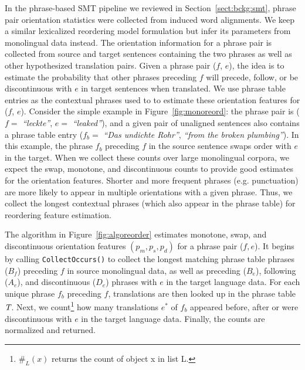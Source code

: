 \documentclass[11pt]{article}
\newcommand{\mnote}[1]{\marginpar{%
  \vskip-\baselineskip
  \raggedright\footnotesize
  \itshape\hrule\smallskip\tiny{#1}\par\smallskip\hrule}}
\newcommand{\mtodo}[1]{\mnote{\textcolor{red}{#1}}}
\newcommand{\secref}[1]{Section~\ref{#1}}
\newcommand{\figref}[1]{Figure~\ref{#1}}
\newcommand{\emq}[1]{\emph{``#1''}}
\begin{document}
In the phrase-based SMT pipeline we reviewed in \secref{sect:bckg:smt}, phrase pair orientation statistics were collected from induced word alignments.  We keep a similar lexicalized reordering model formulation but infer its parameters from monolingual data instead.  The orientation information for a phrase pair is collected from source and target sentences containing the two phrases as well as other hypothesized translation pairs.  Given a phrase pair ($f$, $e$), the idea is to estimate the probability that other phrases preceding $f$ will precede, follow, or be discontinuous with $e$ in target sentences when translated.  We use phrase table entries as the contextual phrases used to to estimate these orientation features for ($f$, $e$). Consider the simple example in \figref{fig:monoreord}: the phrase pair is ($f =$ \emq{leckte}, $e =$ \emq{leaked}), and a given pair of unaligned sentences also contains a phrase table entry ($f_{b} =$ \emq{Das undichte Rohr}, \emq{from the broken plumbing}).  In this example, the phrase $f_{b}$ preceding $f$ in the source sentence swaps order with $e$ in the target.  When we collect these counts over large monolingual corpora, we expect the swap, monotone, and discontinuous counts to provide good estimates for the orientation features.  
Shorter and more frequent phrases (e.g. punctuation) are more likely to appear in multiple orientations with a given phrase.  Thus, we collect the longest contextual phrases (which also appear in the phrase table) for reordering feature estimation.

The algorithm in \figref{fig:algoreorder} estimates monotone, swap, and discontinuous orientation features $(p_m, p_s, p_d)$ for a phrase pair ($f, e$).  It begins by calling {\tt \small CollectOccurs()} to collect the longest matching phrase table phrases ($B_f$) preceding $f$ in source monolingual data, as well as preceding ($B_e$), following ($A_e$), and discontinuous ($D_e$) phrases with $e$ in the target language data.  For each unique phrase $f_{b}$ preceding $f$, translations are then looked up in the phrase table $\emph{T}$.  Next, we count\footnote{$\#_{L}(x)$ returns the count of object x in list L.} how many translations $e^*$ of $f_b$ appeared before, after or were discontinuous with $e$ in the target language data.  Finally, the counts are normalized and returned. \mtodo{Be more specific about the out-of-order counts?}  %
\end{document}
